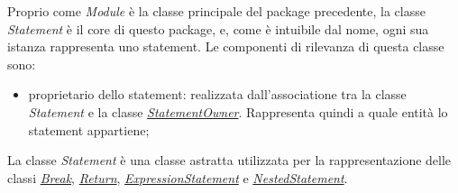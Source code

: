 Proprio come \textit{Module} è la classe principale del package precedente, la classe \textit{Statement} è il core di questo package, e, come è intuibile dal nome, ogni sua istanza rappresenta uno statement. Le componenti di rilevanza di questa classe sono:
\begin{itemize}
	\item proprietario dello statement: realizzata dall'associatione tra la classe \textit{Statement} e la classe \hyperref[sec:modelstranslator:analysis:statements_analysis:statementowner]{\textit{StatementOwner}}. Rappresenta quindi a quale entità lo statement appartiene;
\end{itemize}
La classe \textit{Statement} è una classe astratta utilizzata per la rappresentazione delle classi \hyperref[sec:modelstranslator:analysis:statements_analysis:statement:break]{\textit{Break}}, \hyperref[sec:modelstranslator:analysis:statements_analysis:statement:return]{\textit{Return}}, \hyperref[sec:modelstranslator:analysis:statements_analysis:statement:expressionstatement]{\textit{ExpressionStatement}} e \hyperref[sec:modelstranslator:analysis:statements_analysis:statement:nestedstatement]{\textit{NestedStatement}}.




